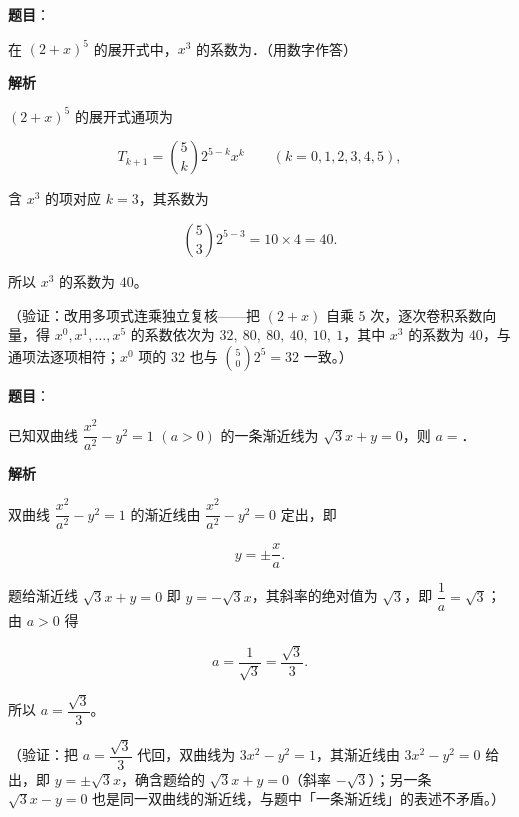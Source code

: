 \begin{answer}

\textbf{题目}：

在 \((2+x)^{5}\) 的展开式中，\(x^{3}\) 的系数为\gkblank{}．（用数字作答）

\textbf{解析}

\((2+x)^{5}\) 的展开式通项为

\nopagebreak[4]
\[
T_{k+1}=\binom{5}{k}2^{5-k}x^{k}\qquad(k=0,1,2,3,4,5),
\]

含 \(x^{3}\) 的项对应 \(k=3\)，其系数为

\nopagebreak[4]
\[
\binom{5}{3}2^{5-3}=10\times4=40.
\]

所以 \(x^{3}\) 的系数为 \(40\)。

（验证：改用多项式连乘独立复核——把 \((2+x)\) 自乘 \(5\) 次，逐次卷积系数向量，得 \(x^{0},x^{1},\dots,x^{5}\) 的系数依次为 \(32,\ 80,\ 80,\ 40,\ 10,\ 1\)，其中 \(x^{3}\) 的系数为 \(40\)，与通项法逐项相符；\(x^{0}\) 项的 \(32\) 也与 \(\binom{5}{0}2^{5}=32\) 一致。）


\end{answer}
\begin{answer}

\textbf{题目}：

已知双曲线 \(\dfrac{x^{2}}{a^{2}}-y^{2}=1\) \((a>0)\) 的一条渐近线为 \(\sqrt{3}x+y=0\)，则 \(a=\)\gkblank{}．

\textbf{解析}

双曲线 \(\dfrac{x^{2}}{a^{2}}-y^{2}=1\) 的渐近线由 \(\dfrac{x^{2}}{a^{2}}-y^{2}=0\) 定出，即

\nopagebreak[4]
\[
y=\pm\frac{x}{a}.
\]

题给渐近线 \(\sqrt{3}x+y=0\) 即 \(y=-\sqrt{3}x\)，其斜率的绝对值为 \(\sqrt{3}\)，即 \(\dfrac{1}{a}=\sqrt{3}\)；由 \(a>0\) 得

\nopagebreak[4]
\[
a=\frac{1}{\sqrt{3}}=\frac{\sqrt{3}}{3}.
\]

所以 \(a=\dfrac{\sqrt{3}}{3}\)。

（验证：把 \(a=\dfrac{\sqrt{3}}{3}\) 代回，双曲线为 \(3x^{2}-y^{2}=1\)，其渐近线由 \(3x^{2}-y^{2}=0\) 给出，即 \(y=\pm\sqrt{3}x\)，确含题给的 \(\sqrt{3}x+y=0\)（斜率 \(-\sqrt{3}\)）；另一条 \(\sqrt{3}x-y=0\) 也是同一双曲线的渐近线，与题中「一条渐近线」的表述不矛盾。）


\end{answer}
